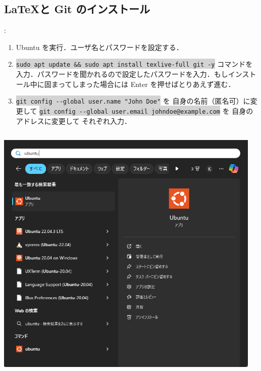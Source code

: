 \documentclass[aspectratio=169,dvipdfmx,cjk]{beamer}
\newcommand{\cmdline}[1]{
    \colorbox{lightgray}{\lstinline[style=command]{#1}}
}
\newcommand{\blue}[1]{ {\color{blue} #1} }
\begin{document}
\subsection{\LaTeX と Git のインストール}
\begin{frame}{\insertsection \thesubsection: \insertsubsection}
  \begin{enumerate}
    \item Ubuntu を実行．ユーザ名とパスワードを設定する．
    \item \cmdline{sudo apt update && sudo apt install texlive-full git -y} コマンドを入力．パスワードを聞かれるので設定したパスワードを入力．もしインストール中に固まってしまった場合には Enter を押せばとりあえず進む\cite{LaTeXBug}．
    \item \cmdline{git config --global user.name "John Doe"} を\blue{自身の名前（匿名可）に変更して} \cmdline{git config --global user.email johndoe@example.com} を\blue{自身のアドレスに変更して}それぞれ入力\cite{GitBook}．
  \end{enumerate}
  \begin{columns}
    \begin{column}{0.2\textwidth}
        \includegraphics[width=1.0\linewidth]{fig/start-ubuntu.png}
    \end{column}
    \begin{column}{0.3\textwidth}

\end{column}
\end{columns}
\end{frame}
\end{document}

